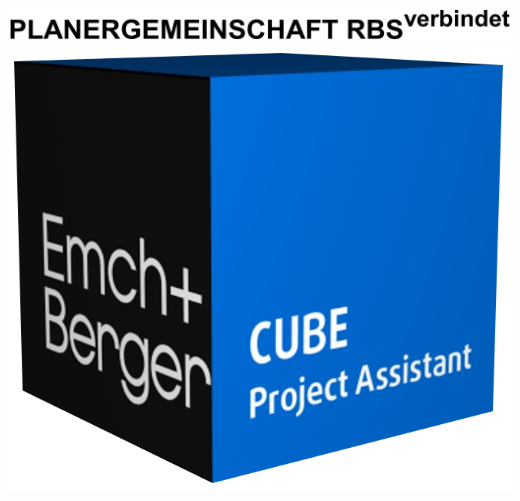 \documentclass{article}
\begin{document}
\pagestyle{empty}




\pagebreak
{} \hspace{8cm} \includegraphics[width=.3\linewidth]{Pictures/PGLogo.png} \quad \includegraphics[width=.07\linewidth]{Pictures/Logo_t.png}


\end{document}
